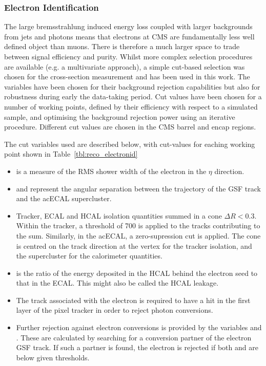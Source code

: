 \subsubsection{Electron Identification}
\label{sec:reco_electron_id}
The large bremsstrahlung induced energy loss coupled with larger backgrounds
from jets and photons means that electrons at \ac{CMS} are fundamentally less
well defined object than muons. There is therefore a much larger space to trade
between signal efficiency and purity. Whilst more complex selection procedures
are available (e.g. a multivariate approach), a simple cut-based selection was
chosen for the \PW cross-section measurement\cite{cms_pas_ewk_10_002} and has been
used in this work. The variables have been chosen for their background rejection
capabilities but also for robustness during early the data-taking period. Cut
values have been chosen for a number of working points, defined by their
efficiency with respect to a simulated \Wenu sample, and optimising the
background rejection power using an iterative procedure. Different cut values
are chosen in the \ac{CMS} barrel and encap regions.

The cut variables used are described below, with cut-values for eaching working
point shown in Table~\ref{tbl:reco_electronid}
\begin{itemize}
\item \sigmaieta is a measure of the \ac{RMS} shower width of the electron
  in the $\eta$ direction.
\item \deltaphiin and \deltaetain represent the angular separation between the
  trajectory of the \ac{GSF} track and the ac{ECAL} supercluster.
\item Tracker, \ac{ECAL} and \ac{HCAL} isolation quantities summed in a cone
  $\Delta R < 0.3$. Within the tracker, a threshold of \unit{700}{\GeV} is
  applied to the tracks contributing to the sum. Similarly, in the ac{ECAL}, a
  zero-supression cut is applied. The cone is centred on the track direction at
  the vertex for the tracker isolation, and the supercluster for the calorimeter
  quantities.
\item \HoverE is the ratio of the energy deposited in the \ac{HCAL} behind the
  electron seed to that in the \ac{ECAL}. This might also be called the
  \ac{HCAL} leakage.
\item The track associated with the electron is required to have a hit in the
  first layer of the pixel tracker in order to reject photon conversions.
\item Further rejection against electron conversions is provided by the
  variables \Dist and \DeltaCotTheta. These are calculated by searching for a
  conversion partner of the electron \ac{GSF} track. If such a partner is found,
  the electron is rejected if both \Dist and \DeltaCotTheta are below given thresholds.
\end{itemize}

